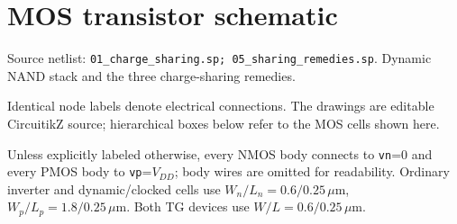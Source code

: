 \clearpage\section{MOS transistor schematic}
\begingroup\small
Source netlist: \texttt{01\_charge\_sharing.sp; 05\_sharing\_remedies.sp}. Dynamic NAND stack and the three charge-sharing remedies.

Identical node labels denote electrical connections. The drawings are editable CircuitikZ source; hierarchical boxes below refer to the MOS cells shown here.

Unless explicitly labeled otherwise, every NMOS body connects to \texttt{vn}=0 and every PMOS body to \texttt{vp}=\(V_{DD}\); body wires are omitted for readability. Ordinary inverter and dynamic/clocked cells use \(W_n/L_n=0.6/0.25\,\mu\mathrm m\), \(W_p/L_p=1.8/0.25\,\mu\mathrm m\). Both TG devices use \(W/L=0.6/0.25\,\mu\mathrm m\). 


